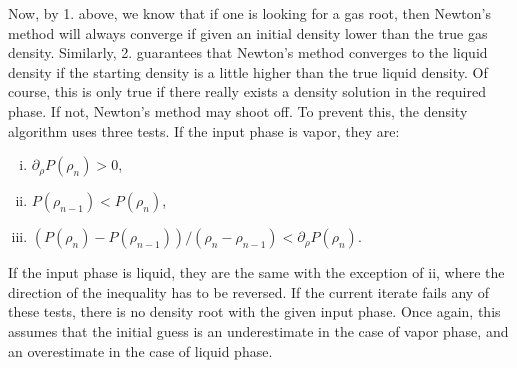 \documentclass[english]{../thermomemo/thermomemo}
\newcommand{\lp}{\left(}
\newcommand{\rp}{\right)}
\numberwithin{equation}{section}
\begin{document}
Now, by 1. above, we know that if one is looking for a gas root, then
Newton's method will always converge if given an initial density lower
than the true gas density. Similarly, 2. guarantees that Newton's
method converges to the liquid density if the starting density is a
little higher than the true liquid density. 
Of course, this is only true if there really exists a density solution
in the required phase. If not, Newton's method may shoot off. To
prevent this, the density algorithm uses three tests. If the input
phase is vapor, they are:
\begin{enumerate}[i)]
\item $\partial_\rho P(\rho_n) > 0$,
\item $P(\rho_{n-1}) < P(\rho_{n})$,
\item $\lp P(\rho_{n})-P(\rho_{n-1}) \rp / (\rho_{n}-\rho_{n-1})
  < \partial_\rho P(\rho_{n})$.
\end{enumerate}
If the input phase is liquid, they are the same with the exception of
ii, where the direction of the inequality has to be reversed. If the
current iterate fails any of these tests, there is no density root
with the given input phase. Once again, this assumes that the initial
guess is an underestimate in the case of vapor phase, and an overestimate in
the case of liquid phase.
\end{document}
